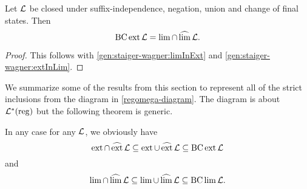 \begin{theorem}
\label{gen:staiger-wagner}
Let $\mathcal{L}$ be closed under suffix-independence, negation, union and change of final states. Then
\[ \operatorname{BC} \operatorname{ext} \mathcal{L} = \lim \cap \operatorname{\widehat{lim}} \mathcal{L} . \]

\begin{proof}
This follows with \cref{gen:staiger-wagner:limInExt} and \cref{gen:staiger-wagner:extInLim}.
\end{proof}
\end{theorem}


We summarize some of the results from this section to represent all of the strict inclusions from the diagram in \cref{regomega-diagram}. The diagram is about $\mathcal{L}^*(\textup{\textrm{reg}})$ but the following theorem is generic.

In any case for any $\mathcal{L}$, we obviously have
\[ \operatorname{ext} \cap \operatorname{\widehat{ext}} \mathcal{L} \subseteq
\operatorname{ext} \cup \operatorname{\widehat{ext}} \mathcal{L} \subseteq
\operatorname{BC} \operatorname{ext} \mathcal{L} \]
and
\[ \lim \cap \operatorname{\widehat{lim}} \mathcal{L} \subseteq
\lim \cup \operatorname{\widehat{lim}} \mathcal{L} \subseteq
\operatorname{BC} \lim \mathcal{L} . \]


